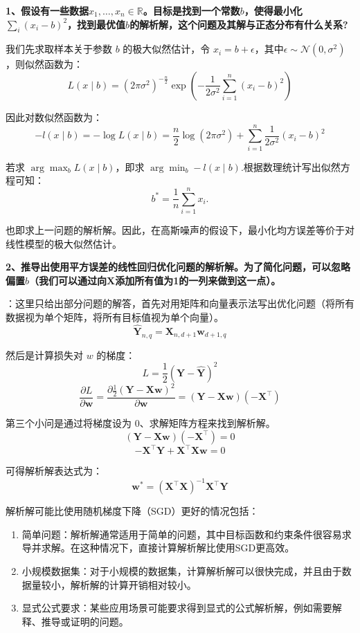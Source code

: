 \documentclass[UTF8]{ctexart}
\begin{document}
	\textbf{1、假设有一些数据$x_1, \ldots, x_n \in \mathbb{R}$。目标是找到一个常数$b$，使得最小化$\sum_i (x_i - b)^2$，找到最优值$b$的解析解，这个问题及其解与正态分布有什么关系?}
	
	
	我们先求取样本关于参数 $b$ 的极大似然估计，令 $ x_i = b + \epsilon $，其中$\epsilon \sim \mathcal{N}(0, \sigma^2)$，则似然函数为：
	\[
	L(x \mid b) = (2\pi\sigma^2)^{-\frac{n}{2}} \exp\left( -\frac{1}{2\sigma^2} \sum_{i=1}^n (x_i - b)^2 \right)
	\]
	
	因此对数似然函数为：
	\[
	-l(x \mid b)= -\log L(x \mid b) = \frac{n}{2} \log(2\pi\sigma^2) + \sum_{i=1}^n \frac{1}{2\sigma^2} (x_i - b)^2
	\]
	
	若求 $\arg \max_b L(x \mid b)$，即求 $\arg \min_b -l(x \mid b)$.根据数理统计写出似然方程可知：
	\[
	b^* = \frac{1}{n} \sum_{i=1}^n x_i.
	\]
	
	也即求上一问题的解析解。因此，在高斯噪声的假设下，最小化均方误差等价于对线性模型的极大似然估计。
	
	
	\textbf{2、推导出使用平方误差的线性回归优化问题的解析解。为了简化问题，可以忽略偏置$b$（我们可以通过向$\mathbf X$添加所有值为1的一列来做到这一点）。}
		
	：这里只给出部分问题的解答，首先对用矩阵和向量表示法写出优化问题（将所有数据视为单个矩阵，将所有目标值视为单个向量）。
	$$
	\hat{\bm{Y}}_{n,q} = \bm{X}_{n,d+1} \bm{w}_{d+1,q}
	$$
	
	然后是计算损失对 $ w $ 的梯度：
	$$
	L = \frac{1}{2} (\bm{Y} - \hat{\bm{Y}})^2
	$$
	$$
	\frac{\partial L}{\partial \bm{w}} = \frac{\partial \frac{1}{2} (\bm{Y} - \bm{X} \bm{w})^2}{\partial \bm{w}} = (\bm{Y} - \bm{X} \bm{w})(-\bm{X}^\top)
	$$
	
	第三个小问是通过将梯度设为 0、求解矩阵方程来找到解析解。
	$$
	(\bm{Y} - \bm{X} \bm{w})(-\bm{X}^\top) = 0
	$$
	$$
	-\bm{X}^\top \bm{Y} + \bm{X}^\top \bm{X} \bm{w} = 0
	$$
	
	可得解析解表达式为：
	$$
	\bm{w}^* = (\bm{X}^\top \bm{X})^{-1} \bm{X}^\top \bm{Y}
	$$
	
	解析解可能比使用随机梯度下降（SGD）更好的情况包括：
	\begin{enumerate}
		\item 简单问题：解析解通常适用于简单的问题，其中目标函数和约束条件很容易求导并求解。在这种情况下，直接计算解析解比使用SGD更高效。
		\item 小规模数据集：对于小规模的数据集，计算解析解可以很快完成，并且由于数据量较小，解析解的计算开销相对较小。
		\item 显式公式要求：某些应用场景可能要求得到显式的公式解析解，例如需要解释、推导或证明的问题。
	\end{enumerate}
	
\end{document}
